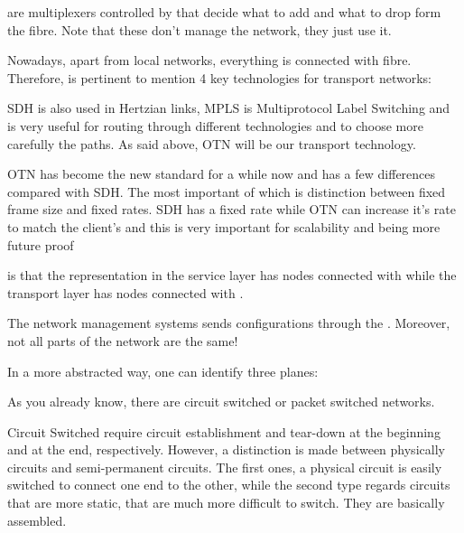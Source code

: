 

 are multiplexers controlled by  that decide what to add and what to drop form the fibre. Note that these don't manage the network, they just use it.

Nowadays, apart from local networks, everything is connected with fibre. Therefore, is pertinent to mention 4 key technologies for transport networks:


SDH is also used in Hertzian links, MPLS is Multiprotocol Label Switching and is very useful for routing through different technologies and to choose more carefully the paths. As said above, OTN will be our transport technology.

OTN has become the new standard for a while now and has a few differences compared with SDH. The most important of which is distinction between fixed frame size and fixed rates. SDH has a fixed rate while OTN can increase it's rate to match the client's and this is very important for scalability and being more future proof

 is that the representation in the service layer has nodes connected with  while the transport layer has nodes connected with .



The network management systems sends configurations through the . Moreover, not all parts of the network are the same!



In a more abstracted way, one can identify three planes:


As you already know, there are circuit switched or packet switched networks.

Circuit Switched require circuit establishment and tear-down at the beginning and at the end, respectively. However, a distinction is made between physically  circuits and semi-permanent circuits. The first ones, a physical circuit is easily switched to connect one end to the other, while the second type regards circuits that are more static, that are much more difficult to switch. They are basically assembled. 














